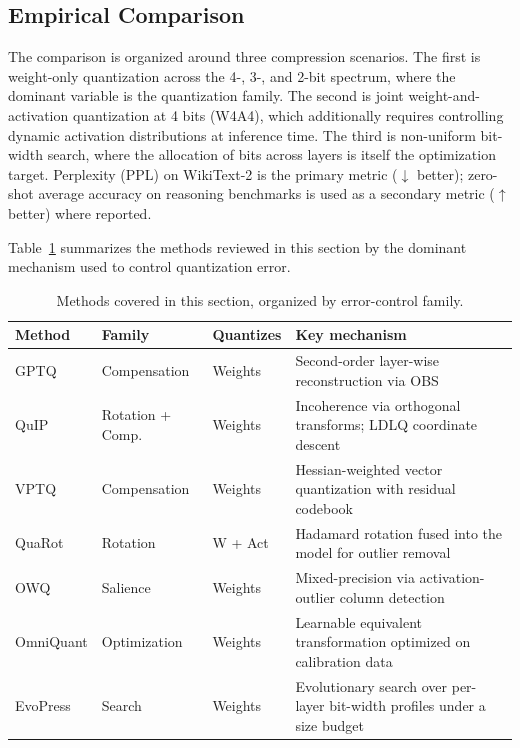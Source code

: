 \subsection{Empirical Comparison}

The comparison is organized around three compression scenarios. The first is weight-only quantization across the 4-, 3-, and 2-bit spectrum, where the dominant variable is the quantization family. The second is joint weight-and-activation quantization at 4 bits (W4A4), which additionally requires controlling dynamic activation distributions at inference time. The third is non-uniform bit-width search, where the allocation of bits across layers is itself the optimization target. Perplexity (PPL) on WikiText-2 is the primary metric ($\downarrow$ better); zero-shot average accuracy on reasoning benchmarks is used as a secondary metric ($\uparrow$ better) where reported.

Table~\ref{tab:ptq-taxonomy} summarizes the methods reviewed in this section by the dominant mechanism used to control quantization error.

\begin{table}[htbp]
\centering
\caption[PTQ methods by family]{Methods covered in this section, organized by error-control family.}
\label{tab:ptq-taxonomy}
\begin{tabular}{lllp{7.5cm}}
  \toprule
  \textbf{Method} & \textbf{Family} & \textbf{Quantizes} & \textbf{Key mechanism} \\
  \midrule
  GPTQ      & Compensation         & Weights      & Second-order layer-wise reconstruction via OBS \\
  QuIP      & Rotation + Comp.     & Weights      & Incoherence via orthogonal transforms; LDLQ coordinate descent \\
  VPTQ      & Compensation         & Weights      & Hessian-weighted vector quantization with residual codebook \\
  QuaRot    & Rotation             & W + Act      & Hadamard rotation fused into the model for outlier removal \\
  OWQ       & Salience             & Weights      & Mixed-precision via activation-outlier column detection \\
  OmniQuant & Optimization         & Weights      & Learnable equivalent transformation optimized on calibration data \\
  EvoPress  & Search               & Weights      & Evolutionary search over per-layer bit-width profiles under a size budget \\
  \bottomrule
\end{tabular}
\end{table}


